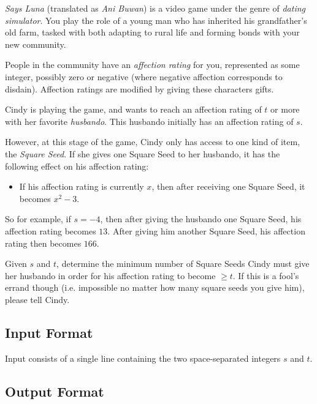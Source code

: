 

\textit{Says Luna} (translated as \textit{Ani Buwan}) is a video game under the genre of \textit{dating simulator}.  You play the role of a young man who has inherited his grandfather's old farm, tasked with both adapting to rural life and forming bonds with your new community.

People in the community have an \textit{affection rating} for you, represented as some integer, possibly zero or negative (where negative affection corresponds to disdain).  Affection ratings are modified by giving these characters gifts.

Cindy is playing the game, and wants to reach an affection rating of $t$ or more with her favorite \textit{husbando}.  This husbando initially has an affection rating of $s$.  

However, at this stage of the game, Cindy only has access to one kind of item, the \textit{Square Seed}.  If she gives one Square Seed to her husbando, it has the following effect on his affection rating:
\begin{itemize}
    \item If his affection rating is currently $x$, then after receiving one Square Seed, \newline it becomes $x^2 - 3$.
\end{itemize}
So for example, if $s=-4$, then after giving the husbando one Square Seed, his affection rating becomes $13$.  After giving him another Square Seed, his affection rating then becomes $166$.

Given $s$ and $t$, determine the minimum number of Square Seeds Cindy must give her husbando in order for his affection rating to become $\geq t$.  If this is a fool's errand though (i.e. impossible no matter how many square seeds you give him), please tell Cindy.

\subsection*{Input Format}

Input consists of a single line containing the two space-separated integers $s$ and $t$.

\subsection*{Output Format}

